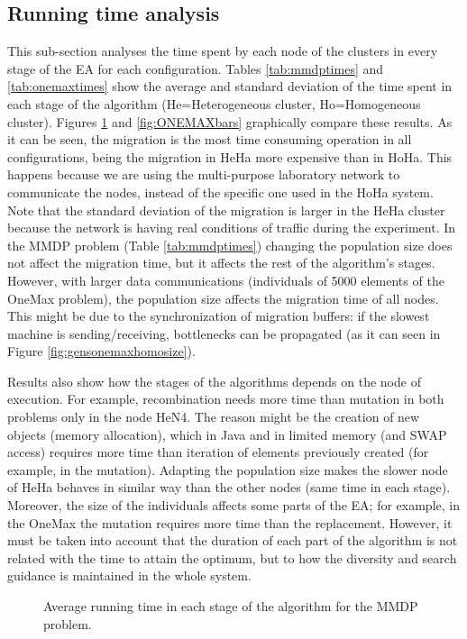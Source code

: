 \documentclass[final,1p,times]{elsarticle}
\begin{document}
\subsection{Running time analysis}

This sub-section analyses the time spent by each node of the clusters in every stage of the EA for each configuration. Tables \ref{tab:mmdptimes} and \ref{tab:onemaxtimes} show the average and standard deviation of the time spent in each stage of the algorithm (He=Heterogeneous cluster, Ho=Homogeneous cluster). Figures \ref{fig:MMDPbars} and \ref{fig:ONEMAXbars} graphically compare these results. As it can be seen, the migration is the most time consuming operation in all configurations, being the migration in HeHa more expensive than in HoHa. This happens because we are using the multi-purpose laboratory network to communicate the nodes, instead of the specific one used in the HoHa system. Note that the standard deviation of the migration is larger in the HeHa cluster because the network is having real conditions of traffic during the experiment. In the MMDP problem (Table \ref{tab:mmdptimes}) changing the population size does not affect the migration time, but it affects the rest of the algorithm's stages. However, with larger data communications (individuals of 5000 elements of the OneMax problem), the population size affects the migration time of all nodes. This might be due to the synchronization of migration buffers: if the slowest machine is sending/receiving, bottlenecks can be propagated (as it can seen in Figure \ref{fig:gensonemaxhomosize}). 

Results also show how the stages of the algorithms depends on the node
of execution. For example, recombination needs more time than mutation
in both problems only in the node HeN4. The reason might be the
creation of new objects (memory allocation), which in Java and in
limited memory (and SWAP access) requires more time than iteration of
elements previously created (for example, in the mutation). Adapting
the population size makes the slower node of HeHa behaves in similar
way than the other nodes (same time in each stage). Moreover, the size
of the individuals affects some parts of the EA; for example, in the
OneMax the mutation requires more time than the replacement. However,
it must be taken into account that the duration of each part of the
algorithm is not related with the time to attain the optimum, but to
how the diversity and search guidance is maintained in the whole system.  

\begin{figure}[htb]
\centering
{}
\caption{Average running time in each stage of the algorithm for the MMDP problem.}
\label{fig:MMDPbars}
\end{figure}
\end{document}
